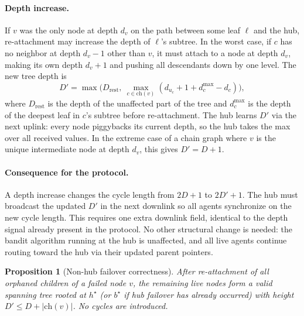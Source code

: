 \documentclass{article}
\newtheorem{proposition}{Proposition}
\begin{document}
\paragraph{Depth increase.} If $v$ was the only node at depth $d_v$ on the path between
some leaf $\ell$ and the hub, re-attachment may increase the depth of $\ell$'s subtree.
In the worst case, if $c$ has no neighbor at depth $d_v - 1$ other than $v$, it must
attach to a node at depth $d_v$, making its own depth $d_v + 1$ and pushing all
descendants down by one level. The new tree depth is
\[
    D' = \max\bigl(D_{\mathrm{rest}},\ \max_{c \in \mathrm{ch}(v)} (d_{u_c} + 1 + d_c^{\max} - d_c)\bigr),
\]
where $D_{\mathrm{rest}}$ is the depth of the unaffected part of the tree and
$d_c^{\max}$ is the depth of the deepest leaf in $c$'s subtree before re-attachment.
The hub learns $D'$ via the next uplink: every node piggybacks its current depth, so
the hub takes the max over all received values. In the extreme case of a chain graph
where $v$ is the unique intermediate node at depth $d_v$, this gives $D' = D + 1$.

\paragraph{Consequence for the protocol.} A depth increase changes the cycle length from
$2D + 1$ to $2D' + 1$. The hub must broadcast the updated $D'$ in the next downlink so
all agents synchronize on the new cycle length. This requires one extra downlink field,
identical to the depth signal already present in the protocol. No other structural change
is needed: the bandit algorithm running at the hub is unaffected, and all live agents
continue routing toward the hub via their updated parent pointers.

\begin{proposition}[Non-hub failover correctness]
\label{prop:nonhub}
    After re-attachment of all orphaned children of a failed node $v$, the remaining live
    nodes form a valid spanning tree rooted at $h^\star$ (or $b^\star$ if hub failover
    has already occurred) with height $D' \leq D + |\mathrm{ch}(v)|$. No cycles are
    introduced.
\end{proposition}
\end{document}
